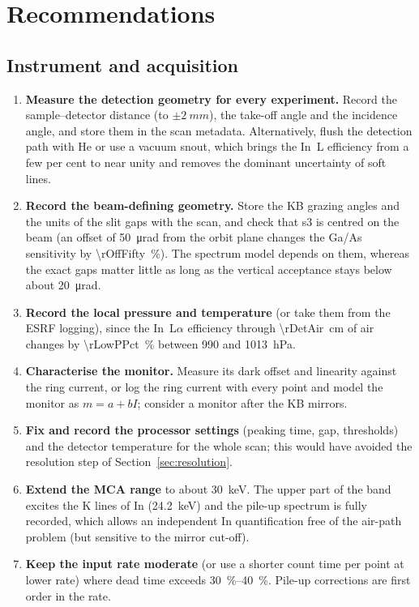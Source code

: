 \documentclass[11pt,a4paper]{article}
\begin{document}
\section{Recommendations}\label{sec:recommendations}
\subsection{Instrument and acquisition}
\begin{enumerate}[leftmargin=*,itemsep=2pt]
\item \textbf{Measure the detection geometry for every experiment.} Record the sample--detector distance
(to $\pm\qty{2}{mm}$), the take-off angle and the incidence angle, and store them in the scan metadata.
Alternatively, flush the detection path with He or use a vacuum snout, which brings the In~L
efficiency from a few per cent to near unity and removes the dominant uncertainty of soft lines.
\item \textbf{Record the beam-defining geometry.} Store the KB grazing angles and the units of the slit
gaps with the scan, and check that s3 is centred on the beam (an offset of \qty{50}{\micro\radian}
from the orbit plane changes the Ga/As sensitivity by \qty{\rOffFifty}{\percent}). The spectrum
model depends on them, whereas the exact gaps matter little as long as the vertical acceptance stays
below about \qty{20}{\micro\radian}.
\item \textbf{Record the local pressure and temperature} (or take them from the ESRF logging), since
the In~L$\alpha$ efficiency through \qty{\rDetAir}{cm} of air changes by \qty{\rLowPPct}{\percent} between \num{990} and \qty{1013}{hPa}.
\item \textbf{Characterise the monitor.} Measure its dark offset and linearity against the ring current,
or log the ring current with every point and model the monitor as $m=a+bI$; consider a monitor after
the KB mirrors.
\item \textbf{Fix and record the processor settings} (peaking time, gap, thresholds) and the detector
temperature for the whole scan; this would have avoided the resolution step of
Section~\ref{sec:resolution}.
\item \textbf{Extend the MCA range} to about \qty{30}{keV}. The upper part of the band excites the K lines
of In (\qty{24.2}{keV}) and the pile-up spectrum is fully recorded, which allows an independent In
quantification free of the air-path problem (but sensitive to the mirror cut-off).
\item \textbf{Keep the input rate moderate} (or use a shorter count time per point at lower rate) where
dead time exceeds \qtyrange{30}{40}{\percent}. Pile-up corrections are first order in the rate.
\end{enumerate}
\end{document}
